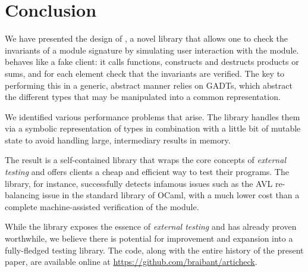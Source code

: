 \section*{Conclusion}

We have presented the design of \arti, a novel library that allows one to check
the invariants of a module signature by simulating user interaction with the
module. \arti behaves like a fake client: it calls functions, constructs and
destructs products or sums, and for each element check that the invariants are
verified. The key to performing this in a generic, abstract manner relies on
GADTs, which abstract the different types that may be manipulated into a common
representation.

We identified various performance problems that arise. The library handles them
via a symbolic representation of types in combination with a little bit of
mutable state to avoid handling large, intermediary results in memory.

The result is a self-contained library that wraps the core concepts of
\emph{external testing} and offers clients a cheap and efficient way to test
their programs. The library, for instance, successfully detects infamous issues
such as the AVL re-balancing issue in the standard library of OCaml, with a much
lower cost than a complete machine-assisted verification of the module.

While the library exposes the essence of \emph{external testing} and has already
proven worthwhile, we believe there is potential for improvement and expansion
into a fully-fledged testing library. The code, along with the entire history of
the present paper, are available online at
\url{https://github.com/braibant/articheck}.
